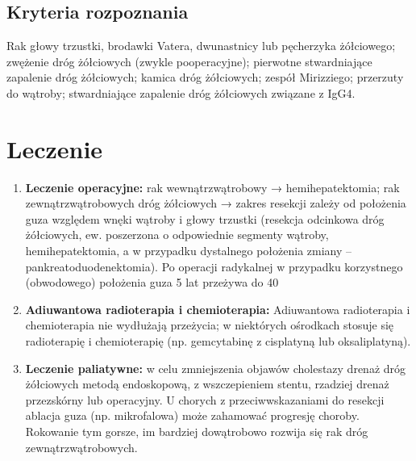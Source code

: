 \subsection{Kryteria rozpoznania}

Rak głowy trzustki, brodawki Vatera, dwunastnicy lub pęcherzyka żółciowego; zwężenie dróg żółciowych (zwykle pooperacyjne); pierwotne stwardniające zapalenie dróg żółciowych; kamica dróg żółciowych; zespół Mirizziego; przerzuty do wątroby; stwardniające zapalenie dróg żółciowych związane z IgG4.

\section{Leczenie}

\begin{enumerate}
    \item \textbf{Leczenie operacyjne:} rak wewnątrzwątrobowy → hemihepatektomia; rak zewnątrzwątrobowych dróg żółciowych → zakres resekcji zależy od położenia guza względem wnęki wątroby i głowy trzustki (resekcja odcinkowa dróg żółciowych, ew. poszerzona o odpowiednie segmenty wątroby, hemihepatektomia, a w przypadku dystalnego położenia zmiany – pankreatoduodenektomia). Po operacji radykalnej w przypadku korzystnego (obwodowego) położenia guza 5 lat przeżywa do 40%

    \item \textbf{Adiuwantowa radioterapia i chemioterapia:} Adiuwantowa radioterapia i chemioterapia nie wydłużają przeżycia; w niektórych ośrodkach stosuje się radioterapię i chemioterapię (np. gemcytabinę z cisplatyną lub oksaliplatyną).

    \item \textbf{Leczenie paliatywne:} w celu zmniejszenia objawów cholestazy drenaż dróg żółciowych metodą endoskopową, z wszczepieniem stentu, rzadziej drenaż przezskórny lub operacyjny. 
    U chorych z przeciwwskazaniami do resekcji ablacja guza (np. mikrofalowa) może zahamować progresję choroby. 
    Rokowanie tym gorsze, im bardziej dowątrobowo rozwija się rak dróg zewnątrzwątrobowych.
\end{enumerate}
